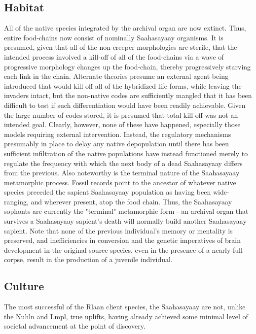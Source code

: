 \subsection{Habitat}
All of the native species integrated by the archival organ are now
extinct. Thus, entire food-chains now consist of nominally Saahasayaay
organisms. It is presumed, given that all of the non-creeper
morphologies are sterile, that the intended process involved a
kill-off of all of the food-chains via a wave of progressive
morphology changes up the food-chain, thereby progressively starving
each link in the chain. Alternate theories presume an external agent
being introduced that would kill off all of the hybridized life forms,
while leaving the invaders intact, but the non-native codes are
sufficiently mangled that it has been difficult to test if such
differentiation would have been readily achievable. Given the large
number of codes stored, it is presumed that total kill-off was not an
intended goal. Clearly, however, none of these have happened,
especially those models requiring external intervention. Instead, the
regulatory mechanisms presumably in place to delay any native
depopulation until there has been sufficient infiltration of the
native populations have instead functioned merely to regulate the
frequency with which the next body of a dead Saahasayaay differs from
the previous. Also noteworthy is the terminal nature of the
Saahasayaay metamorphic process. Fossil records point to the ancestor
of whatever native species preceded the sapient Saahasayaay population
as having been wide-ranging, and wherever present, atop the food
chain. Thus, the Saahasayaay sophonts are currently the "terminal"
metamorphic form - an archival organ that survives a Saahasayaay
sapient's death will normally build another Saahasayaay sapient. Note
that none of the previous individual's memory or mentality is
preserved, and inefficiencies in conversion and the genetic
imperatives of brain development in the original source species, even
in the presence of a nearly full corpse, result in the production of a
juvenile individual.

\subsection{Culture}

The most successful of the Rlaan client species, the Saahasayaay are
not, unlike the Nuhln and Lmpl, true uplifts, having already achieved
some minimal level of societal advancement at the point of discovery.

